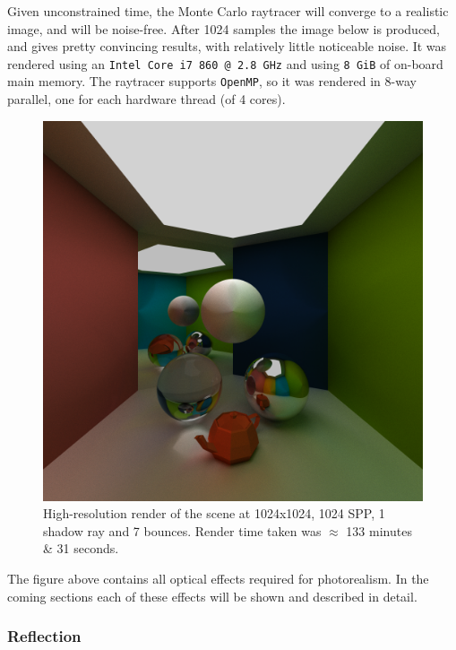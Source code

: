 \documentclass[a4paper, twocolumn]{article}
\begin{document}
        Given unconstrained time, the Monte Carlo raytracer will converge to a realistic image, and will be noise-free. After 1024 samples the image below is produced, and gives pretty convincing results, with relatively little noticeable noise. It was rendered using an \texttt{Intel Core i7 860 @ 2.8 GHz} and using \texttt{8 GiB} of on-board main memory. The raytracer supports \texttt{OpenMP}, so it was rendered in 8-way parallel, one for each hardware thread (of 4 cores).

            \begin{figure}[H]
                \centering
                \includegraphics[width=\linewidth]{share/the_render.png}
                \caption{High-resolution render of the scene at 1024x1024, 1024 SPP, 1 shadow ray and 7 bounces. Render time taken was \(\approx\) 133 minutes \& 31 seconds.}
                \label{fig:render}
            \end{figure}

            The figure above contains all optical effects required for photorealism. In the coming sections each of these effects will be shown and described in detail.

            \subsubsection*{Reflection}
\end{document}
